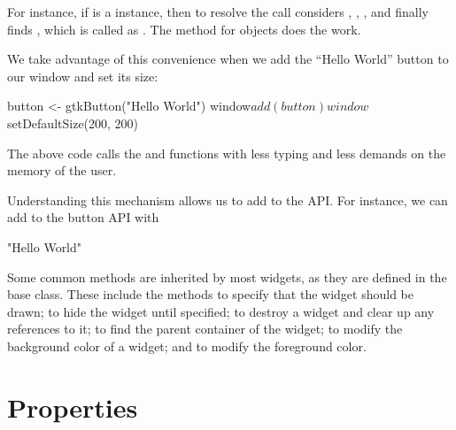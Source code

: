 For instance, if  is a  instance, then
to resolve the call   considers
, ,
,  and finally finds
, which is called as
. The  method
for  objects does the work.

We take advantage of this convenience when we add the ``Hello World''
button to our window and set its size:
\begin{Schunk}
\begin{Sinput}
 button <- gtkButton("Hello World")
 window$add(button)
 window$setDefaultSize(200, 200)
\end{Sinput}
\end{Schunk}
%
The above code calls the  and
 functions with less typing and less
demands on the memory of the user.

Understanding this mechanism allows us to add to the 
API. For instance, we can add to the button API with
\begin{Schunk}
\begin{Soutput}
[1] "Hello World"
\end{Soutput}
\end{Schunk}

Some common methods are inherited by most widgets, as they are defined
in the base  class. These include the methods 
 to specify that the widget should be drawn;
 to hide the widget until specified;
 to destroy a widget and clear up any
references to it;  to find the parent
container of the widget;  to modify the
background color of a widget; and  to
modify the foreground color.


\section{Properties}


